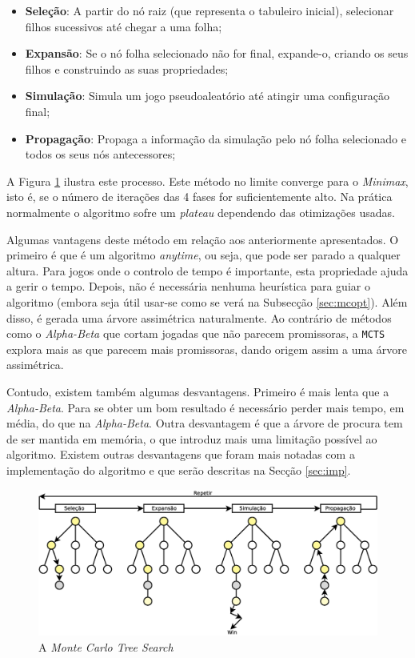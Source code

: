 \documentclass[12pt,a4paper,oneside]{article}
\begin{document}
\begin{itemize}
  \item \textbf{Seleção}: A partir do nó raiz (que representa o
    tabuleiro inicial), selecionar filhos sucessivos até chegar a uma
    folha;
  \item \textbf{Expansão}: Se o nó folha selecionado não for final,
    expande-o, criando os seus filhos e construindo as suas
    propriedades;
  \item \textbf{Simulação}: Simula um jogo pseudoaleatório até atingir
    uma configuração final;
  \item \textbf{Propagação}: Propaga a informação da simulação pelo nó
    folha selecionado e todos os seus nós antecessores;
\end{itemize}

A Figura \ref{fig:mcts} ilustra este processo. Este método no limite
converge para o \textit{Minimax}, isto é, se o número de iterações das
4 fases for suficientemente alto. Na prática normalmente o algoritmo
sofre um \textit{plateau} dependendo das otimizações usadas.

Algumas vantagens deste método em relação aos anteriormente
apresentados. O primeiro é que é um algoritmo \textit{anytime}, ou
seja, que pode ser parado a qualquer altura. Para jogos onde o
controlo de tempo é importante, esta propriedade ajuda a gerir o
tempo. Depois, não é necessária nenhuma heurística para guiar o
algoritmo (embora seja útil usar-se como se verá na Subsecção
\ref{sec:mcopt}). Além disso, é gerada uma árvore assimétrica
naturalmente. Ao contrário de métodos como o \textit{Alpha-Beta} que
cortam jogadas que não parecem promissoras, a \texttt{MCTS} explora
mais as que parecem mais promissoras, dando origem assim a uma árvore
assimétrica.

Contudo, existem também algumas desvantagens. Primeiro é mais lenta
que a \textit{Alpha-Beta}. Para se obter um bom resultado é necessário
perder mais tempo, em média, do que na \textit{Alpha-Beta}. Outra
desvantagem é que a árvore de procura tem de ser mantida em memória, o
que introduz mais uma limitação possível ao algoritmo. Existem outras
desvantagens que foram mais notadas com a implementação do algoritmo e
que serão descritas na Secção \ref{sec:imp}.

\begin{figure}[!htb]
  \centering
  \includegraphics[width=1\textwidth]{mcts}
  \caption{A \textit{Monte Carlo Tree Search}}
  \label{fig:mcts}
\end{figure}
\end{document}

